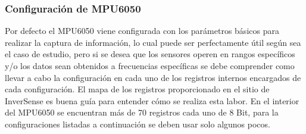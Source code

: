 \documentclass[12pt,a4paper]{article}
\begin{document}
\subsubsection{Configuración de MPU6050} \label{config_MPU6050}
Por defecto el MPU6050 viene configurada con los parámetros básicos para realizar la captura de información, lo cual puede ser perfectamente útil según sea el caso de estudio, pero si se desea que los sensores operen en rangos específicos y/o los datos sean obtenidos a frecuencias específicas se debe comprender como llevar a cabo la configuración en cada uno de los registros internos encargados de cada configuración. El mapa de los registros \cite{MAPREGISTER} proporcionado  en el sitio de InverSense es buena guía para entender cómo se realiza esta labor.
\newline En el interior del MPU6050 se encuentran más de 70 registros cada uno de 8 Bit, para la configuraciones listadas a continuación se deben usar solo algunos pocos.
\end{document}

